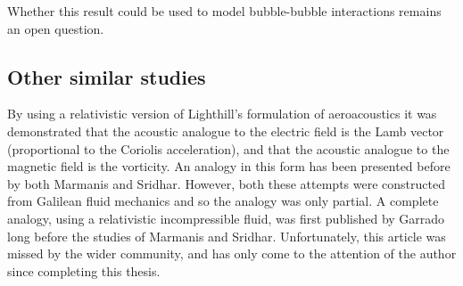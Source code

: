 Whether this result could be used to model bubble-bubble interactions remains an open question.





\subsection{Other similar studies}

By using a relativistic version of Lighthill's formulation of aeroacoustics it was demonstrated 
that the acoustic analogue to the electric field is the Lamb vector (proportional to the Coriolis acceleration),
and that the acoustic analogue to the magnetic field is the vorticity.
An analogy in this form has been presented before by both Marmanis\cite{Marmanis2000} and Sridhar\cite{Marmanis2000,Sridhar1998}.
However, both these attempts were constructed from Galilean fluid mechanics and so the analogy was only partial.
A complete  analogy, using a relativistic incompressible fluid, was first published by Garrado\cite{Garrado1982} long before the studies of Marmanis and Sridhar.  
Unfortunately, this article was missed by the wider community, 
and has only come to the attention of the author since completing this thesis.



